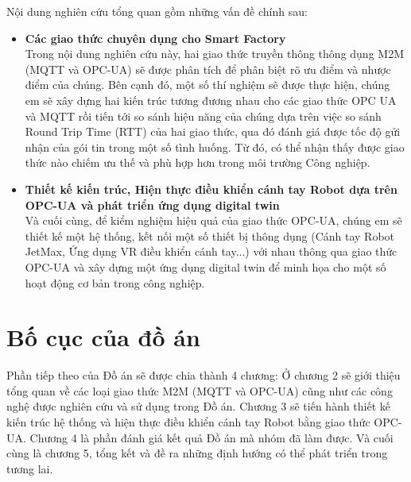 Nội dung nghiên cứu tổng quan gồm những vấn đề chính sau:
\begin{itemize}
    \item \textbf{Các giao thức chuyên dụng cho Smart Factory}\\
    	Trong nội dung nghiên cứu này, hai giao thức truyền thông thông dụng M2M (MQTT và OPC-UA) sẽ được phân tích để phân biệt rõ ưu điểm và nhược điểm của chúng. Bên cạnh đó, một số thí nghiệm sẽ được thực hiện, chúng em sẽ xây dựng hai kiến trúc tương đương nhau cho các giao thức OPC UA và MQTT rồi tiến tới so sánh hiệu năng của chúng dựa trên việc so sánh Round Trip Time (RTT) của hai giao thức, qua đó đánh giá được tốc độ gửi nhận của gói tin trong một số tình huống. Từ đó, có thể nhận thấy được giao thức nào chiếm ưu thế và phù hợp hơn trong môi trường Công nghiệp.
    \item \textbf{Thiết kế kiến trúc, Hiện thực điều khiển cánh tay Robot dựa trên OPC-UA và phát triển ứng dụng digital twin}\\
    	Và cuối cùng, để kiểm nghiệm hiệu quả của giao thức OPC-UA, chúng em sẽ thiết kế một hệ thống, kết nối một số thiết bị thông dụng (Cánh tay Robot JetMax, Ứng dụng VR điều khiển cánh tay...) với nhau thông qua giao thức OPC-UA và xây dựng một ứng dụng digital twin để minh họa cho một số hoạt động cơ bản trong công nghiệp.

    
\end{itemize}

\section{Bố cục của đồ án}

Phần tiếp theo của Đồ án sẽ được chia thành 4 chương: Ở chương 2 sẽ giới thiệu tổng quan về các loại giao thức M2M (MQTT và OPC-UA) cũng như các công nghệ được nghiên cứu và sử dụng trong Đồ án. Chương 3 sẽ tiến hành thiết kế kiến trúc hệ thống và hiện thực điều khiển cánh tay Robot bằng giao thức OPC-UA. Chương 4 là phần đánh giá kết quả Đồ án mà nhóm đã làm được. Và cuối cùng là chương 5, tổng kết và đề ra những định hướng có thể phát triển trong tương lai.
